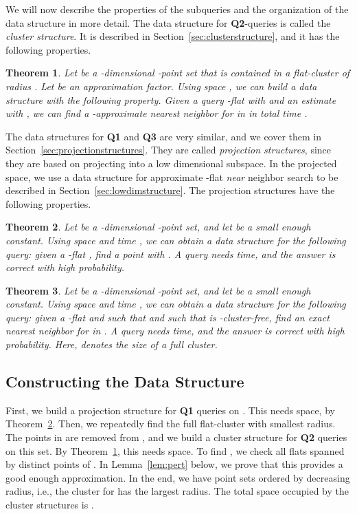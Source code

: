 \documentclass[a4paper,11pt]{paper}
\newtheorem{theorem} {Theorem}[section]
\begin{document}
We will now describe the properties of the subqueries and the
organization of the data structure in more detail.
The data structure for \textbf{Q2}-queries is called the
\emph{cluster structure}. It is described in
Section~\ref{sec:clusterstructure}, and it has
the following properties.

\begin{theorem}\label{thm:q2}
  Let  be a -dimensional -point set
  that is contained in a flat-cluster of radius .
  Let  be an approximation factor.
  Using space
  , we can build a data
  structure with the following property.
  Given a query -flat  with 
  and an estimate  with
  ,
  we can find
  a -approximate nearest neighbor for  in  in total
  time
  .
\end{theorem}
The data structures for \textbf{Q1} and \textbf{Q3} are very similar,
and we cover them in Section~\ref{sec:projectionstructures}.
They are called \emph{projection structures}, since
they are based on projecting  into a low dimensional
subspace.
In the projected space, we use a
data structure for approximate -flat \textit{near}
neighbor search to be described in
Section~\ref{sec:lowdimstructure}.
The projection structures have the following properties.
\begin{theorem}
 \label{thm:q1}
 Let  be a -dimensional -point set, and let  be
 a small enough constant.
Using space and time , we can obtain
a data structure for the following query:
given a -flat , find a point  with
.
A query needs  time, and
the answer is correct with high probability.
\end{theorem}

\begin{theorem}
 \label{thm:q3}
 Let  be a -dimensional -point set, and let  be
 a small enough constant.
Using space and time , we can obtain
a data structure for the following query:
given a -flat  and  such that
 and such that  is
-cluster-free, find an exact nearest neighbor for
 in . A query needs 
time, and the answer is correct with high probability.
Here,  denotes the size of a full cluster.
\end{theorem}

\subsection{Constructing the Data Structure}

First, we build a projection structure for \textbf{Q1} queries
on . This needs  space,
by Theorem~\ref{thm:q1}.
Then, we repeatedly find the full flat-cluster  with smallest
radius.
The  points in  are removed from , and we build
a cluster structure for \textbf{Q2} queries on this set.
By Theorem~\ref{thm:q2}, this needs
 space.
To find , we check all flats  spanned
by  distinct points of . In Lemma~\ref{lem:pert} below,
we prove that this provides a good enough approximation.
In the end, we have  point sets
 ordered by decreasing radius,
i.e., the cluster for  has the largest radius.
The total space occupied  by the cluster structures is
.
\end{document}
